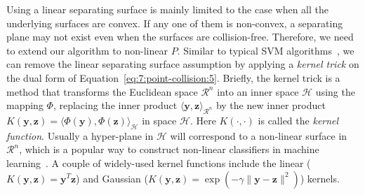 Using a linear separating surface is mainly limited to the case when all the underlying surfaces are convex. If any one of them is non-convex, a separating plane may not exist even when
the surfaces are collision-free. Therefore, we need to extend our algorithm to non-linear $P$. Similar to typical SVM algorithms~\cite{Vapnik:1995:NSL}, we can remove the linear separating surface assumption by applying a {\em kernel trick} on the
dual form of Equation~\ref{eq:7:point-collision:5}. Briefly, the kernel trick is a method that transforms the Euclidean space $\mathcal{R}^n$ into an
inner space $\mathcal{H}$ using the mapping $\Phi$, replacing the inner product $\langle \mathbf y, \mathbf z \rangle_{\mathcal{R}^n}$ by the new inner product $K(\mathbf y, \mathbf z) = \langle \Phi(\mathbf y), \Phi(\mathbf z) \rangle_{\mathcal{H}}$ in space $\mathcal{H}$.
Here $K(\cdot, \cdot)$ is called the {\em kernel function}. Usually a hyper-plane in $\mathcal{H}$ will correspond to a non-linear surface in $\mathcal{R}^n$, which is a popular way to construct non-linear classifiers in machine learning~\cite{Hofmann:2008}. A couple of widely-used kernel functions include the linear ($K(\mathbf y, \mathbf z) = \mathbf y^T \mathbf z$) and Gaussian ($K(\mathbf y, \mathbf z) = \exp(-\gamma \|\mathbf y - \mathbf z\|^2)$) kernels.

